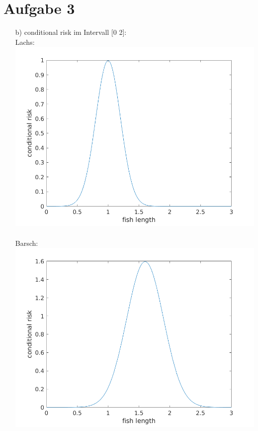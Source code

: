 \documentclass[a4paper]{scrartcl}
\begin{document}
\section*{Aufgabe 3}
\begin{itemize}
	\item[b)] conditional risk im Intervall [0 2]:\\
	Lachs:\\
	\includegraphics*[scale = 0.5]{assignment2_data/plots/cond_risk_salmon.png}\\ \ \\
	Barsch:\\
	\includegraphics*[scale = 0.5]{assignment2_data/plots/cond_risk_seabass.png}
	

\end{itemize}
\end{document}
